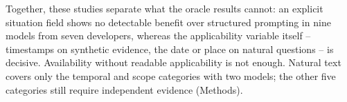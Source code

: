 Together, these studies separate what the oracle results cannot: an explicit
situation field shows no detectable benefit over structured prompting in nine
models from seven developers, whereas the applicability variable itself --
timestamps on synthetic evidence, the date or place on natural questions -- is
decisive. Availability without readable applicability is not enough. Natural
text covers only the temporal and scope categories with two models; the other
five categories still require independent evidence
(Methods).
